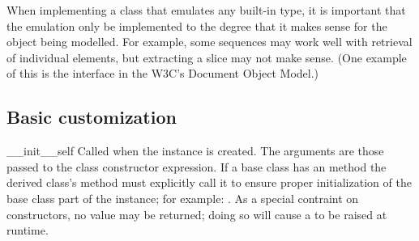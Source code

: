When implementing a class that emulates any built-in type, it is
important that the emulation only be implemented to the degree that it
makes sense for the object being modelled.  For example, some
sequences may work well with retrieval of individual elements, but
extracting a slice may not make sense.  (One example of this is the
 interface in the W3C's Document Object Model.)


\subsection{Basic customization\label{customization}}

\begin{methoddesc}[object]{__init__}{self\optional{, \moreargs}}
Called when the instance is created.  The
arguments are those passed to the class constructor expression.  If a
base class has an  method the derived class's
 method must explicitly call it to ensure proper
initialization of the base class part of the instance; for example:
.  As a special
contraint on constructors, no value may be returned; doing so will
cause a  to be raised at runtime.
\end{methoddesc}


